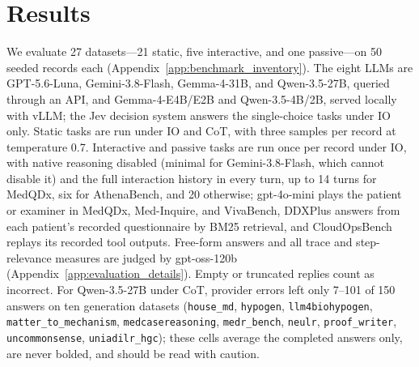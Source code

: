 \section{Results}
We evaluate 27 datasets---21 static, five interactive, and one passive---on 50 seeded records each (Appendix~\ref{app:benchmark_inventory}). The eight LLMs are GPT-5.6-Luna, Gemini-3.8-Flash, Gemma-4-31B, and Qwen-3.5-27B, queried through an API, and Gemma-4-E4B/E2B and Qwen-3.5-4B/2B, served locally with vLLM; the Jev decision system answers the single-choice tasks under IO only. Static tasks are run under IO and CoT, with three samples per record at temperature 0.7. Interactive and passive tasks are run once per record under IO, with native reasoning disabled (minimal for Gemini-3.8-Flash, which cannot disable it) and the full interaction history in every turn, up to 14 turns for MedQDx, six for AthenaBench, and 20 otherwise; gpt-4o-mini plays the patient or examiner in MedQDx, Med-Inquire, and VivaBench, DDXPlus answers from each patient's recorded questionnaire by BM25 retrieval, and CloudOpsBench replays its recorded tool outputs. Free-form answers and all trace and step-relevance measures are judged by gpt-oss-120b (Appendix~\ref{app:evaluation_details}). Empty or truncated replies count as incorrect. For Qwen-3.5-27B under CoT, provider errors left only 7--101 of 150 answers on ten generation datasets (\texttt{house\_md}, \texttt{hypogen}, \texttt{llm4biohypogen}, \texttt{matter\_to\_mechanism}, \texttt{medcasereasoning}, \texttt{medr\_bench}, \texttt{neulr}, \texttt{proof\_writer}, \texttt{uncommonsense}, \texttt{uniadilr\_hgc}); these cells average the completed answers only, are never bolded, and should be read with caution.

